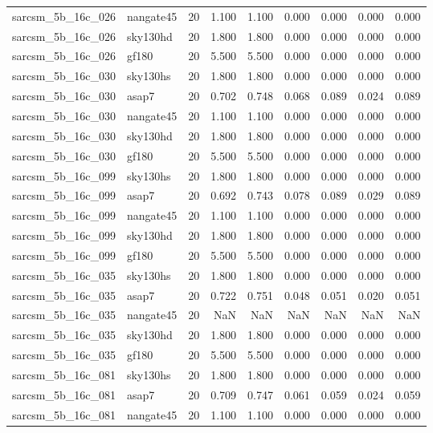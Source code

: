 \begin{tabular}{llrrrrrrr}
sarcsm\_5b\_16c\_026 & nangate45 & 20 & 1.100 & 1.100 & 0.000 & 0.000 & 0.000 & 0.000 \\
sarcsm\_5b\_16c\_026 & sky130hd & 20 & 1.800 & 1.800 & 0.000 & 0.000 & 0.000 & 0.000 \\
sarcsm\_5b\_16c\_026 & gf180 & 20 & 5.500 & 5.500 & 0.000 & 0.000 & 0.000 & 0.000 \\
sarcsm\_5b\_16c\_030 & sky130hs & 20 & 1.800 & 1.800 & 0.000 & 0.000 & 0.000 & 0.000 \\
sarcsm\_5b\_16c\_030 & asap7 & 20 & 0.702 & 0.748 & 0.068 & 0.089 & 0.024 & 0.089 \\
sarcsm\_5b\_16c\_030 & nangate45 & 20 & 1.100 & 1.100 & 0.000 & 0.000 & 0.000 & 0.000 \\
sarcsm\_5b\_16c\_030 & sky130hd & 20 & 1.800 & 1.800 & 0.000 & 0.000 & 0.000 & 0.000 \\
sarcsm\_5b\_16c\_030 & gf180 & 20 & 5.500 & 5.500 & 0.000 & 0.000 & 0.000 & 0.000 \\
sarcsm\_5b\_16c\_099 & sky130hs & 20 & 1.800 & 1.800 & 0.000 & 0.000 & 0.000 & 0.000 \\
sarcsm\_5b\_16c\_099 & asap7 & 20 & 0.692 & 0.743 & 0.078 & 0.089 & 0.029 & 0.089 \\
sarcsm\_5b\_16c\_099 & nangate45 & 20 & 1.100 & 1.100 & 0.000 & 0.000 & 0.000 & 0.000 \\
sarcsm\_5b\_16c\_099 & sky130hd & 20 & 1.800 & 1.800 & 0.000 & 0.000 & 0.000 & 0.000 \\
sarcsm\_5b\_16c\_099 & gf180 & 20 & 5.500 & 5.500 & 0.000 & 0.000 & 0.000 & 0.000 \\
sarcsm\_5b\_16c\_035 & sky130hs & 20 & 1.800 & 1.800 & 0.000 & 0.000 & 0.000 & 0.000 \\
sarcsm\_5b\_16c\_035 & asap7 & 20 & 0.722 & 0.751 & 0.048 & 0.051 & 0.020 & 0.051 \\
sarcsm\_5b\_16c\_035 & nangate45 & 20 & NaN & NaN & NaN & NaN & NaN & NaN \\
sarcsm\_5b\_16c\_035 & sky130hd & 20 & 1.800 & 1.800 & 0.000 & 0.000 & 0.000 & 0.000 \\
sarcsm\_5b\_16c\_035 & gf180 & 20 & 5.500 & 5.500 & 0.000 & 0.000 & 0.000 & 0.000 \\
sarcsm\_5b\_16c\_081 & sky130hs & 20 & 1.800 & 1.800 & 0.000 & 0.000 & 0.000 & 0.000 \\
sarcsm\_5b\_16c\_081 & asap7 & 20 & 0.709 & 0.747 & 0.061 & 0.059 & 0.024 & 0.059 \\
sarcsm\_5b\_16c\_081 & nangate45 & 20 & 1.100 & 1.100 & 0.000 & 0.000 & 0.000 & 0.000 \\

\end{tabular}
